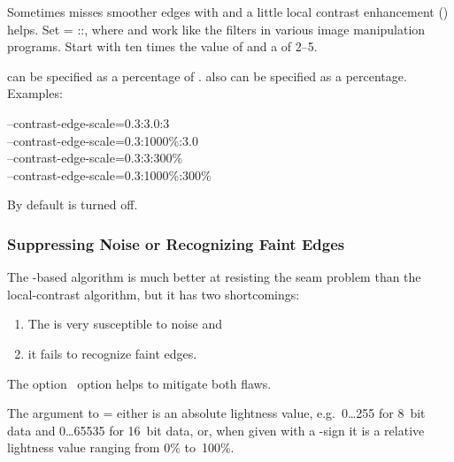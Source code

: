Sometimes \App{} misses smoother edges with  and a little local
contrast enhancement () helps.  Set =\feasiblebreak
{}:\feasiblebreak {}:\feasiblebreak {}, where
 and  work like the
 filters in various image manipulation
programs.  Start with  ten times the value of  and a
 of 2--5.

 can be specified as a percentage of .  
also can be specified as a percentage.  Examples:

\begin{literal}
--contrast-edge-scale=0.3:3.0:3 \\
--contrast-edge-scale=0.3:1000\%:3.0 \\
--contrast-edge-scale=0.3:3:300\% \\
--contrast-edge-scale=0.3:1000\%:300\%
\end{literal}

By default  is turned off.


\subsubsection[Suppressing Noise or Recognizing Faint Edges]{%
  \label{sec:suppressing-noise-or-recognizing-faint-edges}%
  Suppressing Noise or Recognizing Faint Edges}

The -based algorithm is much better at resisting the seam problem than the
local-contrast algorithm, but it has two shortcomings:

\begin{enumerate}
\item
  The  is very susceptible to noise and

\item
  it fails to recognize faint edges.
\end{enumerate}

\noindent The option~ option helps to mitigate both flaws.

The argument to = either is an absolute
lightness value, e.g.\ 0\dots255 for 8~bit data and 0\dots65535 for 16~bit data, or, when given
with a \sample{\%}-sign it is a relative lightness value ranging from 0\% to~100\%.

